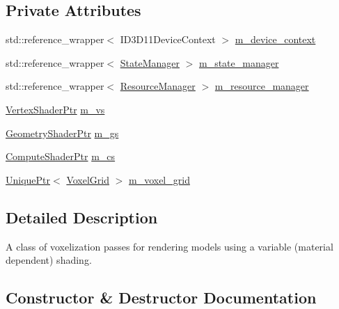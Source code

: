 \subsection*{Private Attributes}
\begin{DoxyCompactItemize}
\item 
std\+::reference\+\_\+wrapper$<$ I\+D3\+D11\+Device\+Context $>$ \hyperlink{classmage_1_1rendering_1_1_voxelization_pass_a44fc5652aed364651c7f58db658fc951}{m\+\_\+device\+\_\+context}
\item 
std\+::reference\+\_\+wrapper$<$ \hyperlink{classmage_1_1rendering_1_1_state_manager}{State\+Manager} $>$ \hyperlink{classmage_1_1rendering_1_1_voxelization_pass_a449470bf0e0a246a2457b87289155330}{m\+\_\+state\+\_\+manager}
\item 
std\+::reference\+\_\+wrapper$<$ \hyperlink{classmage_1_1rendering_1_1_resource_manager}{Resource\+Manager} $>$ \hyperlink{classmage_1_1rendering_1_1_voxelization_pass_aadfa94217df7498078ae49effc6b438b}{m\+\_\+resource\+\_\+manager}
\item 
\hyperlink{namespacemage_1_1rendering_aaf704b9c54a4181f4950a1761de69dda}{Vertex\+Shader\+Ptr} \hyperlink{classmage_1_1rendering_1_1_voxelization_pass_aa95ee5cba6cfdf82d115f080421aee1c}{m\+\_\+vs}
\item 
\hyperlink{namespacemage_1_1rendering_aa5d63f80f9483d0896718813768ba1cf}{Geometry\+Shader\+Ptr} \hyperlink{classmage_1_1rendering_1_1_voxelization_pass_ac6161a5ea8a4203c4026afecf90755d4}{m\+\_\+gs}
\item 
\hyperlink{namespacemage_1_1rendering_ab3dc9f2114f2e9255b91d9c051da52ea}{Compute\+Shader\+Ptr} \hyperlink{classmage_1_1rendering_1_1_voxelization_pass_ae3d844f54f0a3c1e2949b8cb38836eeb}{m\+\_\+cs}
\item 
\hyperlink{namespacemage_a3316d7143a973e37adf1110f2e80ca31}{Unique\+Ptr}$<$ \hyperlink{classmage_1_1rendering_1_1_voxel_grid}{Voxel\+Grid} $>$ \hyperlink{classmage_1_1rendering_1_1_voxelization_pass_a5263939327363598c9d628db79b3cc49}{m\+\_\+voxel\+\_\+grid}
\end{DoxyCompactItemize}


\subsection{Detailed Description}
A class of voxelization passes for rendering models using a variable (material dependent) shading. 

\subsection{Constructor \& Destructor Documentation}
\hypertarget{classmage_1_1rendering_1_1_voxelization_pass_a5ffb9a465e954b6795bc49dfdd8a21d8}{}\label{classmage_1_1rendering_1_1_voxelization_pass_a5ffb9a465e954b6795bc49dfdd8a21d8} 
